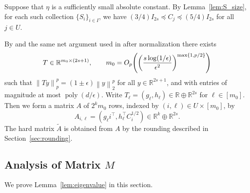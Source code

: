 \documentclass[11pt]{article}
\theoremstyle{remark}
\theoremstyle{definition}
\newcommand{\R}{\mathbb{R}}
\newcommand{\eps}{\epsilon}
\newcommand{\norm}[1]{\left\|#1\right\|}
\DeclareMathOperator{\poly}{poly}
\begin{document}
Suppose that $\eta$ is a sufficiently small absolute constant. By Lemma~\ref{lem:S_size}, for each such collection $\{S_i\}_{i\in I}$, we have $(3/4) I_{2s} \preceq C_j
\preceq (5/4)I_{2s}$ for all $j\in U$.

By \cite[Lemma 7.1]{LWW21} and the same net argument used in \cite[Lemma 7.2]{LWW21} after normalization there
exists
\[
	T\in\R^{m_0\times (2s+1)}, \qquad m_0 = O_p\mleft(\mleft(\frac{s\log(1/\eps)}{\eps^2}\mright)^{\max\{1,p/2\}}\mright)
\]
such that $\norm{Ty}_p^p = (1\pm\eps)\norm{y}_2^p$ for all $y\in\R^{2s+1}$, and with entries of magnitude at most $\poly(d/\eps)$. Write $T_\ell = (g_\ell, h_\ell)\in \R\oplus \R^{2s}$ for $\ell \in [m_0]$. Then we form a matrix $A$ of $2^k m_0$ rows, indexed by $(i,\ell)\in U\times [m_0]$, by	
\[
	A_{i,\ell} = (g_\ell i^\top, h_\ell^\top C_i^{1/2}) \in \R^{k}\oplus \R^{2s}.
\]
The hard matrix $\widetilde{A}$ is obtained from $A$ by the rounding described in Section~\ref{sec:rounding}.

\subsection{Analysis of Matrix $M$}
We prove Lemma~\ref{lem:eigenvalue} in this section.
\end{document}
